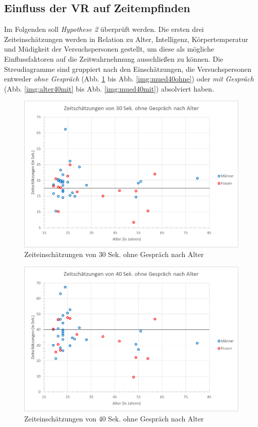 \documentclass{Paper}
\begin{document}
\subsection{Einfluss der VR auf Zeitempfinden}
Im Folgenden soll \textit{Hypothese 2} überprüft werden. Die ersten drei Zeiteinschätzungen werden in Relation zu  Alter, Intelligenz, Körpertemperatur und Müdigkeit der Versuchspersonen gestellt, um diese als mögliche Einflussfaktoren auf die Zeitwahrnehmung ausschließen zu können. Die Streudiagramme sind gruppiert nach den Einschätzungen, die Versuchspersonen entweder \textit{ohne Gespräch} (Abb. \ref{img:alter30ohne} bis Abb. \ref{img:mued40ohne}) oder \textit{mit Gespräch} (Abb. \ref{img:alter40mit} bis Abb. \ref{img:mued40mit}) absolviert haben.


\begin{figure}[H]
	\centering
	\includegraphics[scale=0.7]{../Diagramme/scatterPre/30ohne_alter.png}
	\caption{Zeiteinschätzungen von 30 Sek. ohne Gespräch nach Alter}
	\label{img:alter30ohne}
\end{figure}




\begin{figure}[H]
	\centering
	\includegraphics[scale=0.7]{../Diagramme/scatterPre/40ohne_alter.png}
	\caption{Zeiteinschätzungen von 40 Sek. ohne Gespräch nach Alter}
	\label{img:alter40ohne}
\end{figure}
\end{document}
